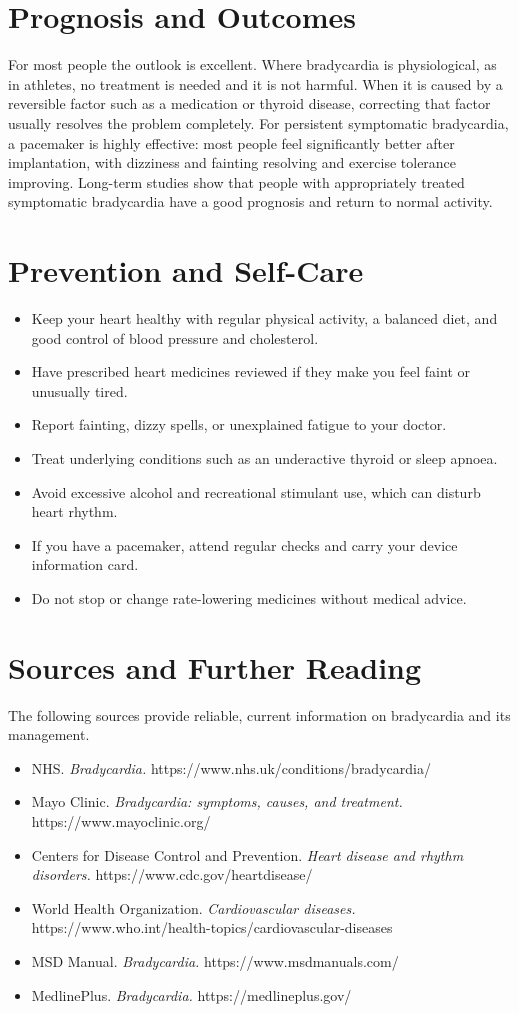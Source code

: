 \section*{Prognosis and Outcomes}
For most people the outlook is excellent. Where bradycardia is physiological, as in athletes, no treatment is needed and it is not harmful. When it is caused by a reversible factor such as a medication or thyroid disease, correcting that factor usually resolves the problem completely. For persistent symptomatic bradycardia, a pacemaker is highly effective: most people feel significantly better after implantation, with dizziness and fainting resolving and exercise tolerance improving. Long-term studies show that people with appropriately treated symptomatic bradycardia have a good prognosis and return to normal activity.

\section*{Prevention and Self-Care}
\begin{itemize}
    \item Keep your heart healthy with regular physical activity, a balanced diet, and good control of blood pressure and cholesterol.
    \item Have prescribed heart medicines reviewed if they make you feel faint or unusually tired.
    \item Report fainting, dizzy spells, or unexplained fatigue to your doctor.
    \item Treat underlying conditions such as an underactive thyroid or sleep apnoea.
    \item Avoid excessive alcohol and recreational stimulant use, which can disturb heart rhythm.
    \item If you have a pacemaker, attend regular checks and carry your device information card.
    \item Do not stop or change rate-lowering medicines without medical advice.
\end{itemize}

\section*{Sources and Further Reading}
The following sources provide reliable, current information on bradycardia and its management.
\begin{itemize}
    \item NHS. \textit{Bradycardia.} https://www.nhs.uk/conditions/bradycardia/
    \item Mayo Clinic. \textit{Bradycardia: symptoms, causes, and treatment.} https://www.mayoclinic.org/
    \item Centers for Disease Control and Prevention. \textit{Heart disease and rhythm disorders.} https://www.cdc.gov/heartdisease/
    \item World Health Organization. \textit{Cardiovascular diseases.} https://www.who.int/health-topics/cardiovascular-diseases
    \item MSD Manual. \textit{Bradycardia.} https://www.msdmanuals.com/
    \item MedlinePlus. \textit{Bradycardia.} https://medlineplus.gov/
\end{itemize}

